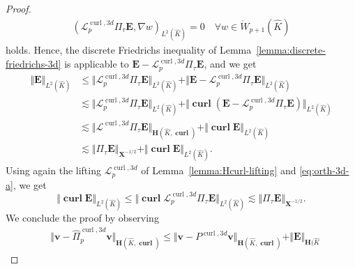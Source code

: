 \documentclass{article}
\newcommand{\hatPicurlcom}{\widehat \Pi^{\operatorname*{curl},3d}_p}
\begin{document}
\begin{proof}
\begin{align*}
(\boldsymbol{\mathcal{L}}^{\operatorname*{curl},3d}_p\Pi_\tau \mathbf{E},\nabla w)_{L^2(\widehat{K})} = 0 \quad \forall w\in\mathring{W}_{p+1}(\widehat{K})
\end{align*}
holds. Hence, the discrete Friedrichs inequality of
Lemma~\ref{lemma:discrete-friedrichs-3d} is applicable to 
$\mathbf{E}-\boldsymbol{\mathcal{L}}^{\operatorname*{curl},3d}_p\Pi_\tau \mathbf{E}$, and we get 
\begin{align}
\Vert{\mathbf{E}}\Vert_{L^{2}(\widehat{K})}  &  \leq\Vert{\boldsymbol{\mathcal{L}}%
}^{\operatorname*{curl},3d}_p\Pi_{\tau}{\mathbf{E}}\Vert_{L^{2}(\widehat{K}%
)}+\Vert{\mathbf{E}}-{\boldsymbol{\mathcal{L}}}^{\operatorname*{curl},3d}_p\Pi_{\tau
}{\mathbf{E}}\Vert_{L^{2}(\widehat{K})}%
\label{eq:thm:H1curl-approximation-100}\\
\nonumber 
&  \lesssim\Vert{\boldsymbol{\mathcal{L}}}^{\operatorname*{curl},3d}_p\Pi_{\tau}{\mathbf{E}%
}\Vert_{L^{2}(\widehat{K})}+\Vert\operatorname{\mathbf{curl}}({\mathbf{E}}%
-{\boldsymbol{\mathcal{L}}}^{\operatorname*{curl},3d}_p\Pi_{\tau}{\mathbf{E}})\Vert
_{L^{2}(\widehat{K})}\\
\nonumber 
&\lesssim\Vert{\boldsymbol{\mathcal{L}}}^{\operatorname*{curl},3d}%
\Pi_{\tau}{\mathbf{E}}\Vert_{\mathbf{H}(\widehat{K},\operatorname{\mathbf{curl}})}%
+\Vert\operatorname{\mathbf{curl}}{\mathbf{E}}\Vert_{L^{2}(\widehat{K})}
\\
\nonumber 
&  \lesssim\Vert\Pi_{\tau}{\mathbf{E}}\Vert_{{\mathbf{X}}^{-1/2}}%
+\Vert\operatorname{\mathbf{curl}}{\mathbf{E}}\Vert_{L^{2}(\widehat{K})}.
\end{align}
Using again the lifting $\boldsymbol{\mathcal{L}}^{\operatorname*{curl},3d}_p$ of
Lemma~\ref{lemma:Hcurl-lifting} and \eqref{eq:orth-3d-a}, we get 
\begin{equation}
\Vert\operatorname{\mathbf{curl}}{\mathbf{E}}\Vert_{L^{2}(\widehat{K})}\leq
\Vert\operatorname{\mathbf{curl}}{\boldsymbol{\mathcal{L}}}^{\operatorname*{curl},3d}_p\Pi_{\tau
}{\mathbf{E}}\Vert_{L^{2}(\widehat{K})}\lesssim\Vert\Pi_{\tau}{\mathbf{E}%
}\Vert_{{\mathbf{X}}^{-1/2}}. \label{eq:thm:H1curl-approximation-200}%
\end{equation}
We conclude the proof by observing
\begin{align*}
& \Vert{\mathbf{v}}-\hatPicurlcom{\mathbf{v}}%
\Vert_{\mathbf{H}(\widehat{K},\operatorname{\mathbf{curl}})}    \leq\Vert{\mathbf{v}%
}-P^{\operatorname*{curl},3d}{\mathbf{v}}\Vert_{\mathbf{H}(\widehat{K}%
,\operatorname{\mathbf{curl}})}+\Vert{\mathbf{E}}\Vert_{\mathbf{H}(\widehat{K}%
}
\end{align*}
\end{proof}
\end{document}
